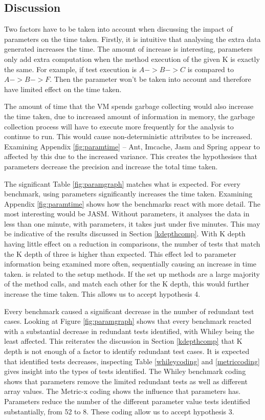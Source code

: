 \subsection{Discussion}
Two factors have to be taken into account when discussing the impact of parameters on the time taken. Firstly, it is intuitive that analysing the extra data generated increases the time. The amount of increase is interesting, parameters only add extra computation when the method execution of the given K is exactly the same. For example, if test execution is $A ->  B ->  C$ is compared to $A ->  B ->  F$. Then the parameter won't be taken into account and therefore have limited effect on the time taken. 

The amount of time that the VM spends garbage collecting would also increase the time taken, due to increased amount of information in memory, the garbage collection process will have to execute more frequently for the analysis to continue to run. This would cause non-deterministic attributes to be increased. Examining Appendix \ref{fig:paramtime} -- Ant, Imcache, Jasm and Spring appear to affected by this due to the increased variance. This creates the hypothesises that parameters decrease the precision and increase the total time taken. 

The significant Table \ref{fig:paramgraph} matches what is expected. For every benchmark, using parameters significantly increases the time taken. Examining Appendix \ref{fig:paramtime} shows how the benchmarks react with more detail. The most interesting would be JASM. Without parameters, it analyses the data in less than one minute, with parameters, it takes just under five minutes. This may be indicative of the results discussed in Section \ref{kdepthcomp}. With K depth having little effect on a reduction in comparisons, the number of tests that match the K depth of three is higher than expected. This effect led to parameter information being examined more often, sequentially causing an increase in time taken.  is related to the setup methods. If the set up methods are a large majority of the method calls, and match each other for the K depth, this would further increase the time taken. This allows us to accept hypothesis 4.

Every benchmark caused a significant decrease in the number of redundant test cases. Looking at Figure \ref{fig:paramgraph} shows that every benchmark reacted with a substantial decrease in redundant tests identified, with Whiley being the least affected. This reiterates the discussion in Section \ref{kdepthcomp} that K depth is not enough of a factor to identify redundant test cases. It is expected that identified tests decreases, inspecting Table \ref{whileycoding} and \ref{metriccoding} gives insight into the types of tests identified. The Whiley benchmark coding shows that parameters remove the limited redundant tests as well as different array values. The Metric-x coding shows the influence that parameters has. Parameters reduce the number of the different parameter value tests identified substantially, from 52 to 8. These coding allow us to accept hypothesis 3.

